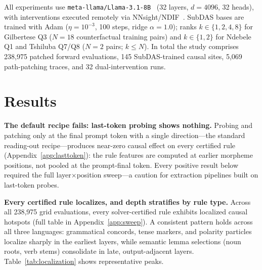 \documentclass{article}
\begin{document}
All experiments use \texttt{meta-llama/Llama-3.1-8B}~\citep{llama3} (32
layers, $d=4096$, 32 heads), with interventions executed remotely via
NNsight/NDIF~\citep{nnsight}. SubDAS bases are trained with Adam
($\eta=10^{-3}$, 100 steps, ridge $\alpha=1.0$); ranks $k \in \{1,2,4,8\}$ for
Gilbertese Q3 ($N=18$ counterfactual training pairs) and $k \in \{1,2\}$ for
Ndebele Q1 and Tshiluba Q7/Q8 ($N=2$ pairs; $k \le N$). In total the study
comprises 238{,}975 patched forward evaluations, 145 SubDAS-trained causal
sites, 5{,}069 path-patching traces, and 32 dual-intervention runs.

\section{Results}
\label{sec:results}

\textbf{The default recipe fails: last-token probing shows nothing.}
Probing and patching only at the final prompt token with a single
direction---the standard reading-out recipe---produces near-zero causal effect
on every certified rule (Appendix~\ref{app:lasttoken}): the rule features are
computed at earlier morpheme positions, not pooled at the prompt-final token.
Every positive result below required the full layer$\times$position sweep---a
caution for extraction pipelines built on last-token probes.

\textbf{Every certified rule localizes, and depth stratifies by rule type.}
Across all 238{,}975 grid evaluations, every solver-certified rule exhibits
localized causal hotspots (full table in Appendix~\ref{app:sweep}). A
consistent pattern holds across all three languages: grammatical concords,
tense markers, and polarity particles localize sharply in the earliest layers,
while semantic lemma selections (noun roots, verb stems) consolidate in late,
output-adjacent layers. Table~\ref{tab:localization} shows representative
peaks.
\end{document}
